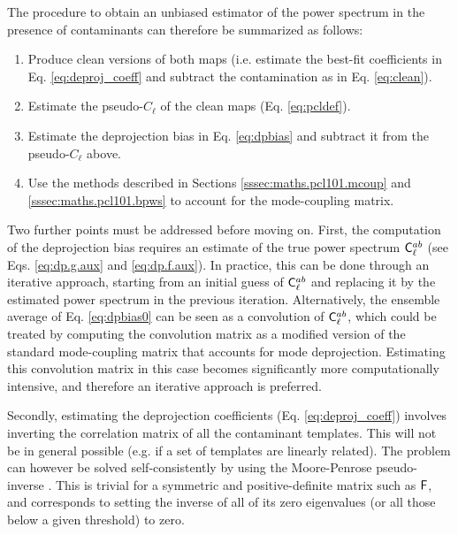 \documentclass[usenatbib]{mnrasb}
\begin{document}
      The procedure to obtain an unbiased estimator of the power spectrum in the presence of contaminants can therefore be summarized as follows:
      \begin{enumerate}
        \item Produce clean versions of both maps (i.e. estimate the best-fit coefficients in Eq. \ref{eq:deproj_coeff} and subtract the contamination as in Eq. \ref{eq:clean}).
        \item Estimate the pseudo-$C_\ell$ of the clean maps (Eq. \ref{eq:pcldef}).
        \item Estimate the deprojection bias in Eq. \ref{eq:dpbias} and subtract it from the pseudo-$C_\ell$ above.
        \item Use the methods described in Sections \ref{sssec:maths.pcl101.mcoup} and  \ref{sssec:maths.pcl101.bpws} to account for the mode-coupling matrix.        
      \end{enumerate}
      
      Two further points must be addressed before moving on. First, the computation of the deprojection bias requires an estimate of the true power spectrum ${\sf C}^{ab}_\ell$ (see Eqs. \ref{eq:dp.g.aux} and \ref{eq:dp.f.aux}). In practice, this can be done through an iterative approach, starting from an initial guess of ${\sf C}^{ab}_\ell$ and replacing it by the estimated power spectrum in the previous iteration. Alternatively, the ensemble average of Eq. \ref{eq:dpbias0} can be seen as a convolution of ${\sf C}^{ab}_\ell$, which could be treated by computing the convolution matrix as a modified version of the standard mode-coupling matrix that accounts for mode deprojection. Estimating this convolution matrix in this case becomes significantly more computationally intensive, and therefore an iterative approach is preferred. 
      
      Secondly, estimating the deprojection coefficients (Eq. \ref{eq:deproj_coeff}) involves inverting the correlation matrix of all the contaminant templates. This will not be in general possible (e.g. if a set of templates are linearly related). The problem can however be solved self-consistently by using the Moore-Penrose pseudo-inverse \citep{2017MNRAS.465.1847E}. This is trivial for a symmetric and positive-definite matrix such as ${\sf F}$, and corresponds to setting the inverse of all of its zero eigenvalues (or all those below a given threshold) to zero.
      
\end{document}
